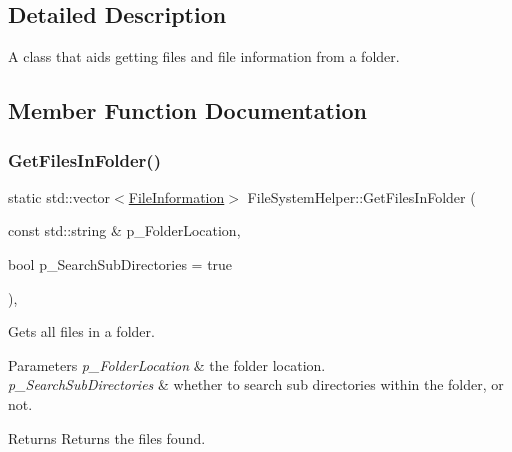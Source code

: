 \subsection{Detailed Description}
A class that aids getting files and file information from a folder. 

\subsection{Member Function Documentation}
\mbox{\label{class_file_system_helper_a5947b684e4a33586eea9c066ca745bf0}} 
\subsubsection{\texorpdfstring{GetFilesInFolder()}{GetFilesInFolder()}}
{\footnotesize\ttfamily static std\+::vector$<$\mbox{\hyperlink{struct_file_information}{File\+Information}}$>$ File\+System\+Helper\+::\+Get\+Files\+In\+Folder (\begin{DoxyParamCaption}\item[{const std\+::string \&}]{p\+\_\+\+Folder\+Location,  }\item[{bool}]{p\+\_\+\+Search\+Sub\+Directories = {\ttfamily true} }\end{DoxyParamCaption})\hspace{0.3cm}{\ttfamily [inline]}, {\ttfamily [static]}}



Gets all files in a folder. 


\begin{DoxyParams}{Parameters}
{\em p\+\_\+\+Folder\+Location} & the folder location. \\
\hline
{\em p\+\_\+\+Search\+Sub\+Directories} & whether to search sub directories within the folder, or not. \\
\hline
\end{DoxyParams}
\begin{DoxyReturn}{Returns}
Returns the files found. 
\end{DoxyReturn}
\mbox{\label{class_file_system_helper_afbd3fec84f5f1212eea6a394162f17bd}} 
